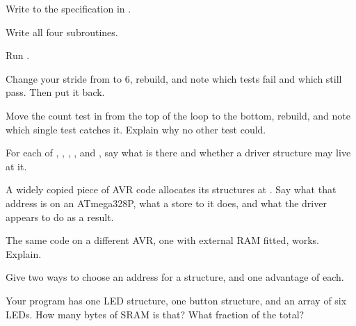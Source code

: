 \label{c4:ex:array}
Write  to the specification in .
\begin{parts}
  \item Write all four subroutines.
  \item Run .
  \item Change your stride from  to 6, rebuild, and note which tests fail and which
    still pass. Then put it back.
  \item Move the count test in  from the top of the loop to the bottom,
    rebuild, and note which single test catches it. Explain why no other test could.
\end{parts}

\label{c4:ex:where}
\begin{parts}
  \item For each of , , , ,  and
    , say what is there and whether a driver structure may live at it.
  \item A widely copied piece of AVR code allocates its structures at . Say what
    that address is on an ATmega328P, what a store to it does, and what the driver appears to do as
    a result.
  \item The same code on a different AVR, one with external RAM fitted, works. Explain.
  \item Give two ways to choose an address for a structure, and one advantage of each.
  \item Your program has one LED structure, one button structure, and an array of six LEDs. How
    many bytes of SRAM is that? What fraction of the total?
\end{parts}

